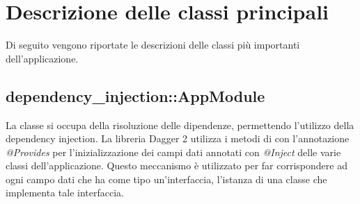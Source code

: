 \documentclass[../Tesi.tex]{subfiles}
\begin{document}
	\section{Descrizione delle classi principali}\label{sec:descrizioneDelleClassiPrincipali}
	Di seguito vengono riportate le descrizioni delle classi più importanti dell'applicazione.

		\subsection{dependency\_injection::AppModule}
		La classe  si occupa della risoluzione delle dipendenze, permettendo l'utilizzo della dependency injection. La libreria Dagger 2 utilizza i metodi di  con l'annotazione \textit{@Provides} per l'inizializzazione dei campi dati annotati con \textit{@Inject} delle varie classi dell'applicazione. Questo meccanismo è utilizzato per far corrispondere ad ogni campo dati che ha come tipo un'interfaccia, l'istanza di una classe che implementa tale interfaccia.
\end{document}
